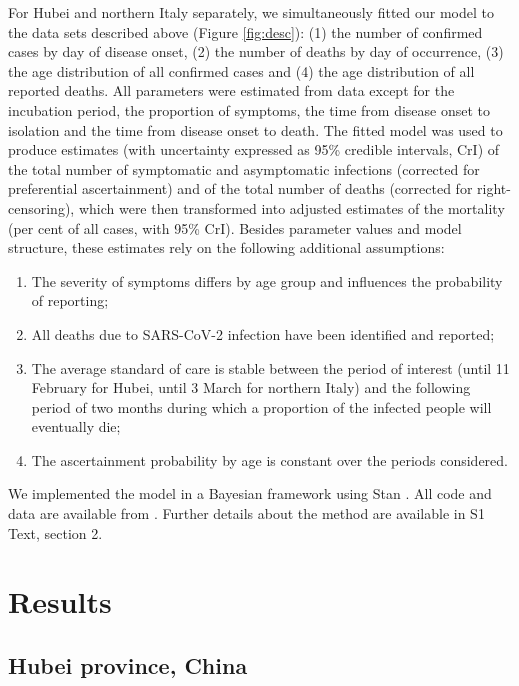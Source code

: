 \documentclass{article}
\begin{document}
For Hubei and northern Italy separately, we simultaneously fitted our model to the data sets described above (Figure \ref{fig:desc}): (1) the number of confirmed cases by day of disease onset, (2) the number of deaths by day of occurrence, (3) the age distribution of all confirmed cases and (4) the age distribution of all reported deaths. 
All parameters were estimated from data except for the incubation period, the proportion of symptoms, the time from disease onset to isolation and the time from disease onset to death.
The fitted model was used to produce estimates (with uncertainty expressed as 95\% credible intervals, CrI) of the total number of symptomatic and asymptomatic infections (corrected for preferential ascertainment) and of the total number of deaths (corrected for right-censoring), which were then transformed into adjusted estimates of the mortality (per cent of all cases, with 95\% CrI).
Besides parameter values and model structure, these estimates rely on the following additional assumptions:
\begin{enumerate}
	\item The severity of symptoms differs by age group and influences the probability of reporting;
	\item All deaths due to SARS-CoV-2 infection have been identified and reported;
	\item The average standard of care is stable between the period of interest (until 11 February for Hubei, until 3 March for northern Italy) and the following period of two months during which a proportion of the infected people will eventually die;
	\item The ascertainment probability by age is constant over the periods considered.
\end{enumerate}

We implemented the model in a Bayesian framework using Stan \cite{Carpenter2017}. 
All code and data are available from \underline{}.
Further details about the method are available in S1 Text, section 2. 

\section*{Results}

\subsection*{Hubei province, China}
\end{document}
